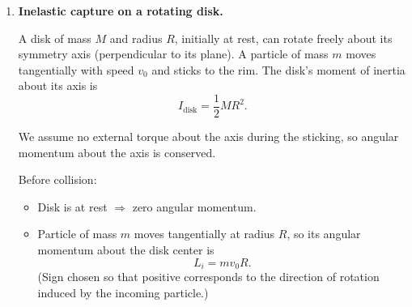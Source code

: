 \documentclass[12pt]{article}
\begin{document}
\begin{enumerate}
\begin{enumerate}
    Solve for $v(x)$:
    \[
    v^2(x)
    = \frac{2k}{m} \left( \frac{1}{\sqrt{x^2 + a^2}} - \frac{1}{\sqrt{x_0^2 + a^2}} \right),
    \]
    \[
    v(x)
    = \sqrt{ \frac{2k}{m} \left( \frac{1}{\sqrt{x^2 + a^2}} - \frac{1}{\sqrt{x_0^2 + a^2}} \right) }.
    \]

    Note: the expression in parentheses must be nonnegative for real $v$. Since the particle starts at $x_0>0$ and is attracted toward $x=0$, $x$ will decrease from $x_0$ toward $0$, and $1/\sqrt{x^2+a^2}$ increases as $|x|$ decreases.

    \item \textit{Maximum speed.}

    The speed increases as the particle moves to where the kinetic energy is largest. From the expression above, $v^2(x)$ is largest when
    \[
    \frac{1}{\sqrt{x^2 + a^2}}
    \quad\text{is largest.}
    \]
    That happens at the smallest possible $\sqrt{x^2+a^2}$, i.e. at $x=0$ (symmetric force will then decelerate it once it passes through and climbs ``up'' on the other side).

    Thus the maximum speed $v_{\max}$ occurs at $x=0$:
    \[
    v_{\max}^2
    = \frac{2k}{m} \left(
    \frac{1}{\sqrt{0 + a^2}} - \frac{1}{\sqrt{x_0^2 + a^2}}
    \right)
    = \frac{2k}{m} \left(
    \frac{1}{a} - \frac{1}{\sqrt{x_0^2 + a^2}}
    \right).
    \]

    Therefore
    \[
    v_{\max}
    = \sqrt{
    \frac{2k}{m} \left(
    \frac{1}{a} - \frac{1}{\sqrt{x_0^2 + a^2}}
    \right)
    }.
    \]

    Interpretation: the force pulls the particle toward the origin like a softened $1/r^2$-type attraction; the speed peaks at the center.
\end{enumerate}


\item \textbf{Inelastic capture on a rotating disk.}

A disk of mass $M$ and radius $R$, initially at rest, can rotate freely about its symmetry axis (perpendicular to its plane). A particle of mass $m$ moves tangentially with speed $v_0$ and sticks to the rim. The disk's moment of inertia about its axis is
\[
I_{\text{disk}} = \frac{1}{2} M R^2.
\]

We assume no external torque about the axis during the sticking, so angular momentum about the axis is conserved.

Before collision:
\begin{itemize}
\item Disk is at rest $\Rightarrow$ zero angular momentum.
\item Particle of mass $m$ moves tangentially at radius $R$, so its angular momentum about the disk center is
\[
L_i = m v_0 R.
\]
(Sign chosen so that positive corresponds to the direction of rotation induced by the incoming particle.)
\end{itemize}


\end{enumerate}
\end{document}
